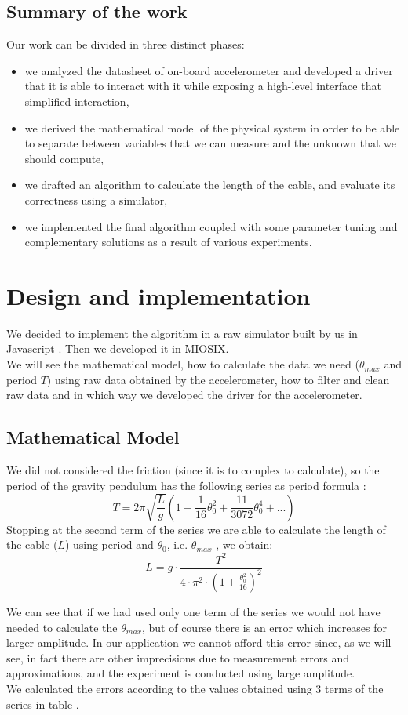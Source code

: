 \subsection{Summary of the work}
Our work can be divided in three distinct phases:
\begin{itemize}
	\item we analyzed the datasheet \cite{accelerometerDatasheet} of on-board accelerometer and developed a driver that it is able to interact with it while exposing a high-level interface that simplified interaction,
	\item we derived the mathematical model of the physical system in order to be able to separate between variables that we can measure and the unknown that we should compute,
	\item we drafted an algorithm to calculate the length of the cable, and evaluate its correctness using a simulator,
	\item we implemented the final algorithm coupled with some parameter tuning and complementary solutions as a result of various experiments. 
\end{itemize}
\pagebreak

\section{Design and implementation}
We decided to implement the algorithm in a raw simulator built by us in Javascript \cite{javascriptPrototype}. Then we developed it in MIOSIX.\\
We will see the mathematical model, how to calculate the data we need ($\theta_{max}$ and period $T$) using raw data obtained by the accelerometer, how to filter and clean raw data and in which way we developed the driver for the accelerometer.

\subsection{Mathematical Model}
\label{sec:mathmodel}
We did not considered the friction (since it is to complex to calculate), so the period of the gravity pendulum has the following series as period formula \cite{pendulumSeries}: 
$$T = 2 \pi \sqrt{\frac{L}{g}} \left(1 + \frac{1}{16} \theta_0^2 + \frac{11}{3072} \theta_0^4 + ...\right)$$
Stopping at the second term of the series we are able to calculate the length of the cable ($L$) using period and $\theta_0$, i.e. $\theta_{max}$ , we obtain:
$$ L = g \cdot \frac{T^2}{4 \cdot \pi^2 \cdot \left(1 + \frac{\theta_0^2}{16}\right)^2}$$
\par
We can see that if we had used only one term of the series we would not have needed to calculate the $\theta_{max}$, but of course there is an error which increases for larger amplitude. In our application we cannot afford this error since, as we will see, in fact there are other imprecisions due to measurement errors and approximations, and the experiment is conducted using large amplitude.\\
We calculated the errors according to the values obtained using 3 terms of the series in table .  

